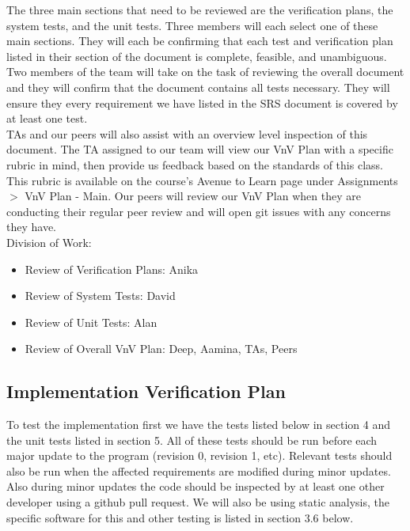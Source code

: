 \documentclass[12pt, titlepage]{article}
\begin{document}
The three main sections that need to be reviewed are the verification plans, the system tests, 
and the unit tests. Three members will each select one of these main sections. They will each be 
confirming that each test and verification plan listed in their section of the document is complete, 
feasible, and unambiguous.\\

Two members of the team will take on the task of reviewing the overall document and they will 
confirm that the document contains all tests necessary. They will ensure they every requirement we 
have listed in the SRS document is covered by at least one test.\\

TAs and our peers will also assist with an overview level inspection of this document. The TA 
assigned to our team will view our VnV Plan with a specific rubric in mind, then provide us feedback 
based on the standards of this class. This rubric is available on the course's Avenue to Learn page under Assignments $>$ VnV Plan - Main. Our peers will review our VnV Plan when they are conducting 
their regular peer review and will open git issues with any concerns they have.\\

\noindent Division of Work:

\begin{itemize}
  \item Review of Verification Plans: Anika
  \item Review of System Tests: David
  \item Review of Unit Tests: Alan
  \item Review of Overall VnV Plan: Deep, Aamina, TAs, Peers
\end{itemize}



\subsection{Implementation Verification Plan}

To test the implementation first we have the tests listed below in section 4 and the unit tests listed in section 5. 
All of these tests should be run before each major update to the program (revision 0, revision 1, etc). Relevant tests should
also be run when the affected requirements are modified during minor updates. Also during minor updates the code should be 
inspected by at least one other developer using a github pull request. We will also be using static analysis, the specific 
software for this and other testing is listed in section 3.6 below.
\end{document}
